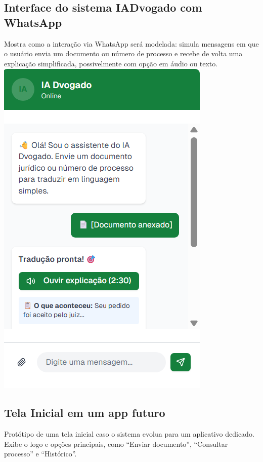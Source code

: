 \documentclass{article}
\begin{document}
\subsection*{Interface do sistema IADvogado com WhatsApp}
Mostra como a interação via WhatsApp será modelada: simula mensagens em que o usuário envia um documento ou número de processo e recebe de volta uma explicação simplificada, possivelmente com opção em áudio ou texto.
\includegraphics{images/488854020-5cb044cf-bd2e-463b-be56-70f556ed3ffc.png}
\newpage

\subsection*{Tela Inicial em um app futuro}
Protótipo de uma tela inicial caso o sistema evolua para um aplicativo dedicado. Exibe o logo e opções principais, como “Enviar documento”, “Consultar processo” e “Histórico”.
\end{document}
